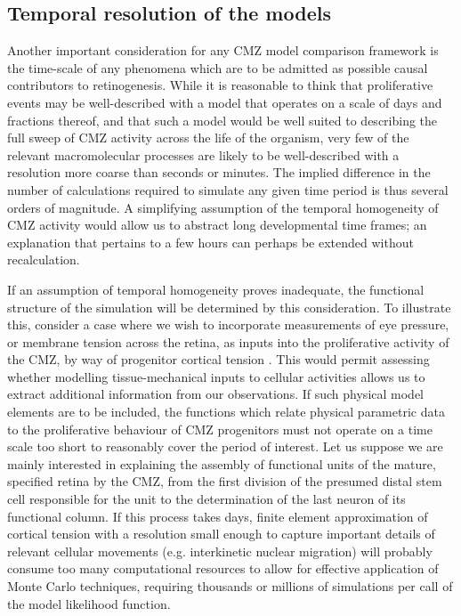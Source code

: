 \subsection{Temporal resolution of the models}
Another important consideration for any CMZ model comparison framework is the time-scale of any phenomena which are to be admitted as possible causal contributors to retinogenesis. While it is reasonable to think that proliferative events may be well-described with a model that operates on a scale of days and fractions thereof, and that such a model would be well suited to describing the full sweep of CMZ activity across the life of the organism, very few of the relevant macromolecular processes are likely to be well-described with a resolution more coarse than seconds or minutes. The implied difference in the number of calculations required to simulate any given time period is thus several orders of magnitude. A simplifying assumption of the temporal homogeneity of CMZ activity would allow us to abstract long developmental time frames; an explanation that pertains to a few hours can perhaps be extended without recalculation. 

If an assumption of temporal homogeneity proves inadequate, the functional structure of the simulation will be determined by this consideration. To illustrate this, consider a case where we wish to incorporate measurements of eye pressure, or membrane tension across the retina, as inputs into the proliferative activity of the CMZ, by way of progenitor cortical tension \cite{Winklbauer2015}. This would permit assessing whether modelling tissue-mechanical inputs to cellular activities allows us to extract additional information from our observations. If such physical model elements are to be included, the functions which relate physical parametric data to the proliferative behaviour of CMZ progenitors must not operate on a time scale too short to reasonably cover the period of interest. Let us suppose we are mainly interested in explaining the assembly of functional units of the mature, specified retina by the CMZ, from the first division of the presumed distal stem cell responsible for the unit to the determination of the last neuron of its functional column. If this process takes days, finite element approximation of cortical tension with a resolution small enough to capture important details of relevant cellular movements (e.g. interkinetic nuclear migration) will probably consume too many computational resources to allow for effective application of Monte Carlo techniques, requiring thousands or millions of simulations per call of the model likelihood function.


